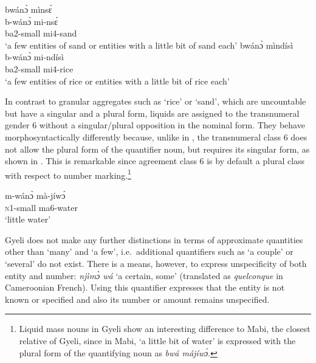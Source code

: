 \ea\label{PLlittle}
\ea \label{PLlittle1}
  \glll bwánɔ̀ mìnsɛ́ \\
  b-wánɔ̀ mi-nsɛ́ \\
    ba2-small mi4-sand\\
    \trans `a few entities of sand or entities with a little bit of sand each'
\ex\label{PLlittle2}
 \glll     bwánɔ̀ mìndísì  \\
 b-wánɔ̀ mi-ndísì  \\
    ba2-small mi4-rice  \\
    \trans `a few entities of rice or entities with a little bit of rice each'
\z
\z

In contrast to granular aggregates such as `rice' or `sand', which are uncountable but have a singular and a plural form, liquids are assigned to the transnumeral gender 6 without a singular/plural opposition in the nominal form. They behave morphosyntactically differently because, unlike in , the transnumeral class 6 does not allow the plural form of the quantifier noun, but requires its singular form, as shown in . This is remarkable since agreement class 6 is by default a plural class with respect to number marking.\footnote{Liquid mass nouns in Gyeli show an interesting difference to Mabi, the closest relative of Gyeli, since in Mabi, `a little bit of water' is expressed with the plural form of the quantifying noun as {\itshape bwá májíwɔ́}.}

\ea\label{littlewater}
\ea \label{littlewater1}
  \gll     m-wánɔ̀ mà-jíwɔ́\\
                \textsc{n}1-small ma6-water \\
    \trans `little water'
\z
\z



Gyeli does not make any further distinctions in terms of approximate quantities other than `many' and `a few', i.e.\ additional quantifiers such as `a couple' or `several' do not exist. There is a means, however, to express unspecificity of both entity and number: {\itshape njìmɔ̀ wá} `a certain, some' (translated as {\itshape quelconque} in Cameroonian French). Using this quantifier expresses that the entity is not known or specified and also its number or amount remains unspecified. 

